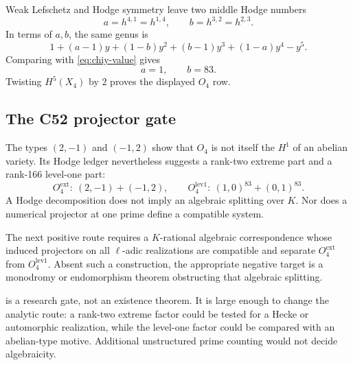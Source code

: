 Weak Lefschetz and Hodge symmetry leave two middle Hodge numbers
\[
 a=h^{4,1}=h^{1,4},\qquad b=h^{3,2}=h^{2,3}.
\]
In terms of \(a,b\), the same genus is
\[
 1+(a-1)y+(1-b)y^2+(b-1)y^3+(1-a)y^4-y^5.
\]
Comparing with \eqref{eq:chiy-value} gives
\[
 a=1,\qquad b=83.
\]
Twisting \(H^5(X_4)\) by \(2\) proves the displayed \(O_4\) row.

\subsection{The C52 projector gate}

The types \((2,-1)\) and \((-1,2)\) show that \(O_4\) is not itself the
\(H^1\) of an abelian variety.  Its Hodge ledger nevertheless suggests a
rank-two extreme part and a rank-166 level-one part:
\[
 O_4^{\mathrm{ext}}:\ (2,-1)+(-1,2),\qquad
 O_4^{\mathrm{lev1}}:\ (1,0)^{83}+(0,1)^{83}.
\]
A Hodge decomposition does not imply an algebraic splitting over \(K\).
Nor does a numerical projector at one prime define a compatible system.

\begin{proposition}[C52 gate]\label{prop:c52-gate}
The next positive route requires a \(K\)-rational algebraic correspondence
whose induced projectors on all \(\ell\)-adic realizations are compatible
and separate \(O_4^{\mathrm{ext}}\) from \(O_4^{\mathrm{lev1}}\).
Absent such a construction, the appropriate negative target is a
monodromy or endomorphism theorem obstructing that algebraic splitting.
\end{proposition}

 is a research gate, not an existence theorem.  It is
large enough to change the analytic route: a rank-two extreme factor could
be tested for a Hecke or automorphic realization, while the level-one
factor could be compared with an abelian-type motive.  Additional
unstructured prime counting would not decide algebraicity.
